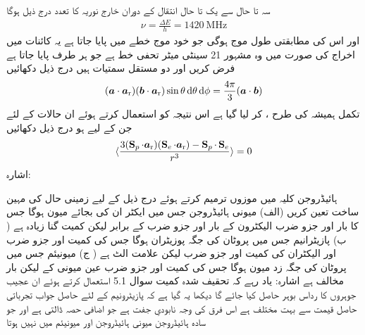 سہ تا حال سے یک تا حال انتقال کے دوران خارج نوریہ کا تعدد درج ذیل ہوگا 
\begin{align}
\nu = \frac{\Delta E}{h} = \SI{1420}{\mega \hertz}
\end{align}
اور اس کی مطابقتی طول موج  ہوگی جو خود موج خطے میں پایا جاتا ہے یہ کائنات میں اخراج کی صورت میں وہ مشہور 21 سینٹی میٹر تحفی خط ہے جو ہر طرف پایا جاتا ہے 
فرض کریں  اور  دو مستقل سمتیات ہیں درج ذیل دکھائیں 
\begin{align}
 (\kvec{a} \cdot \kvec{\kvecsub{a}{r}}) (\kvec{b} \cdot \kvec{\kvecsub{a}{r}}) \sin \theta \dif \theta \dif  \phi = \frac{4 \pi}{3} (\kvec{a} \cdot \kvec{b})
\end{align}
تکمل ہمیشہ کی طرح ،  کر لیا گیا ہے اس نتیجہ کو استعمال کرتے ہوئے ان حالات کے لئے جن کے لیے  ہو درج ذیل دکھائیں 
\begin{align*}
\langle \frac{3 (\operatorname{\mathbf{S}}_p \cdot {\ensuremath{{\boldsymbol{a}}}_{\textup{r}}})(\operatorname{\mathbf{S}}_e \cdot {\ensuremath{{\boldsymbol{a}}}_{\textup{r}}}) - \operatorname{\mathbf{S}}_p \cdot \operatorname{\mathbf{S}}_e}{r^3} \rangle = 0
\end{align*}
اشارہ:  

ہائیڈروجن کلیہ میں موزوں ترمیم کرتے ہوئے درج ذیل کے لیے زمینی حال کی مہین ساخت تعین کریں (الف) میونی ہائیڈروجن جس میں ایکٹر ان کی بجائے میون ہوگا جس کا بار اور  جزو ضرب الیکٹرون کے بار اور  جزو ضرب کے برابر لیکن کمیت  گنا زیادہ ہے ( ب) پازیٹرانیم جس میں پروٹان کی جگہ پوزیٹران ہوگا جس کی کمیت اور  جزو ضرب اور الیکٹران کی کمیت اور  جزو ضرب لیکن علامت الٹ ہے ( ج) میونیئم جس میں پروٹان کی جگہ زد میون ہوگا جس کی کمیت اور  جزو ضرب عين میونی کے لیکن بار مخالف ہے اشارہ: یاد رہے کہ تحقیف شدہ کمیت سوال 5.1 استعمال کرتے ہوئے ان عجیب جوہروں کا رداس بوہر حاصل کیا جائے گا دیکھا یہ گیا ہے کہ پازیٹرونیم کے لئے حاصل جواب  تجرباتی حاصل قیمت  سے بہت مختلف ہے اس فرق کی وجہ     نابودیِ  جفت   ہے جو اضافی  حصہ ڈالتی ہے اور جو سادہ ہائیڈروجن میونی ہائیڈروجن اور ميونيئم میں نہیں ہوتا 


